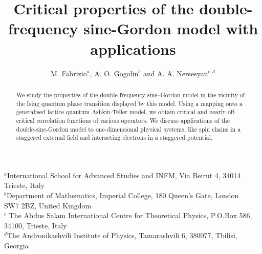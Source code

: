 

\setlength{\textwidth}{14.5cm}
\setlength{\textheight}{23cm}
\setlength{\oddsidemargin}{11mm}
\setlength{\topmargin}{-15mm}
\setlength{\headheight}{8mm}
\setlength{\headsep}{10mm}
\newcommand\be{\begin{equation}}
\newcommand\ee{\end{equation}}
\newcommand\bea{\begin{eqnarray}}
\newcommand\eea{\end{eqnarray}}
\newcommand\bn{\begin{eqnarray*}}
\newcommand\en{\end{eqnarray*}}
\newcommand\pdag{{\phantom{\dagger}}}
\newcommand\rD{\mbox{D}}
\newcommand\reff{\mbox{eff}}
\newcommand\rR{\mbox{R}}
\newcommand\rL{\mbox{L}}
\newcommand\p{\partial}
\newcommand\s{\sigma}
\newcommand\rF{\mbox{F}}
\newcommand\rf{\mbox{f}}
\newcommand\up{\uparrow}
\newcommand\down{\downarrow}
\newcommand\la{\langle}
\newcommand\ra{\rangle}
\newcommand\rd{\mbox{d}}
\newcommand\ri{\mbox{i}}
\newcommand\re{\mbox{e}}
\newcommand\sumnn{\sum_{\langle jk \rangle}}
\newcommand\rk{\mbox{k}}
\newcommand\htau{\hat{\tau}}
\newcommand\var{\varepsilon}
\renewcommand\baselinestretch{1.26}

\title{Critical properties of the double-frequency sine-Gordon model  with applications}
\author{M. Fabrizio$^a$, A. O. Gogolin$^b$ and A. A. Nersesyan$^{c,d}$}
\vspace{2cm}
\maketitle

\begin{center}
$^a$International School for Advanced Studies and INFM,
Via Beirut 4, 34014 Trieste, Italy\\
$^b$Department of Mathematics, Imperial College, 180 Queen's Gate,
London\\
SW7 2BZ, United Kingdom\\
$^c$ The Abdus Salam International Centre for Theoretical Physics,
P.O.Box 586, 34100, Trieste, Italy\\
$^d$The Andronikashvili Institute of Physics, Tamarashvili 6, 380077,
Tbilisi, Georgia
\end{center}

\begin{abstract}

We study the properties of the double-frequency sine--Gordon model
in the vicinity of the
Ising quantum phase transition displayed by this model.
Using a mapping onto a generalised
lattice quantum Ashkin-Teller model, we obtain critical and
nearly-off-critical correlation functions of various operators.
We discuss applications of the double-sine-Gordon
model to one-dimensional physical systems, like
spin chains in a staggered external field and interacting
electrons in a staggered potential.
\end{abstract}

